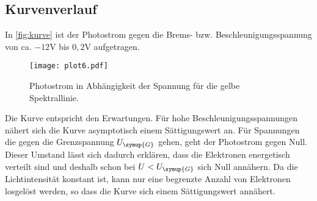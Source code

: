 \subsection{Kurvenverlauf}
\label{sec:Kurvenverlauf}
In \autoref{fig:kurve} ist der Photostrom gegen die Brems- bzw. Beschleunigungsspannung von ca.
$-12\unit{\volt}$ bis $0,2\unit{\volt}$ aufgetragen.
\begin{figure}[!hbt]
    \centering
    \caption{Photostrom in Abhängigkeit der Spannung für die gelbe Spektrallinie.}
    \label{fig:kurve}
    \texttt{[image: plot6.pdf]}
\end{figure}
Die Kurve entspricht den Erwartungen. Für hohe Beschleunigungsspannungen nähert sich die Kurve asymptotisch
einem Sättigungswert an. Für Spannungen die gegen die Grenzspannung $U_{\symup{G}}$ gehen, geht der Photostrom
gegen Null. Dieser Umstand lässt sich dadurch erklären, dass die Elektronen energetisch verteilt sind und deshalb
schon bei $U<U_{\symup{G}}$ sich Null annähern. Da die Lichtintensität konstant ist, kann nur eine begrenzte
Anzahl von Elektronen losgelöst werden, so dass die Kurve sich einem Sättigungswert annähert.